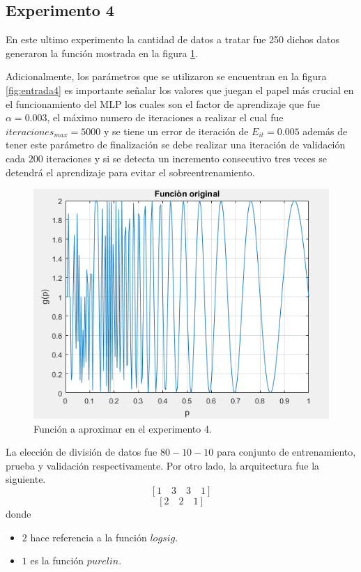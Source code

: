 \subsection{Experimento 4}
En este ultimo experimento la cantidad de datos a tratar fue 250 dichos datos generaron la función mostrada en la figura \ref{fig:original4}.

Adicionalmente, los parámetros que se utilizaron se encuentran en la figura \ref{fig:entrada4} es importante señalar los valores que juegan el papel más crucial en el funcionamiento del MLP los cuales son el factor de aprendizaje que fue$\alpha=0.003$, el máximo numero de iteraciones a realizar el cual fue $iteraciones_{max} = 5000$ y se tiene un error de iteración de $E_{it} = 0.005$ además de tener este parámetro de finalización se debe realizar una iteración de validación cada $200$ iteraciones y si se detecta un incremento consecutivo tres veces se detendrá el aprendizaje para evitar el sobreentrenamiento.
\begin{figure}[H]
    \begin{center}
        \includegraphics[width=12cm]{4/original.png}
        \caption{Función a aproximar en el experimento 4.}
        \label{fig:original4}
    \end{center}
\end{figure}
La elección de división de datos fue $80-10-10$ para conjunto de entrenamiento, prueba y validación respectivamente. Por otro lado, la arquitectura fue la siguiente.
\[ \left[ 1 \quad 3 \quad 3 \quad 1 \right] \]
\[ \left[ 2 \quad 2 \quad 1 \right] \]
donde
\begin{itemize}
    \item $2$ hace referencia a la función $logsig$.
    \item $1$ es la función $purelin$.
\end{itemize}
